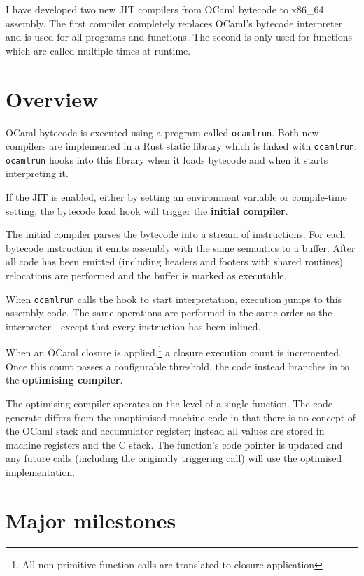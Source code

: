 I have developed two new JIT compilers from OCaml bytecode to x86\_64 assembly. The first compiler
completely replaces OCaml's bytecode interpreter and
is used for all programs and functions. The second is only used for functions which are called
multiple times at runtime.

\section{Overview}

OCaml bytecode is executed using a program called \texttt{ocamlrun}. Both new compilers are
implemented in a Rust static library which is linked with \texttt{ocamlrun}. \texttt{ocamlrun}
hooks into
this library when it loads bytecode and when it starts interpreting it.

If the JIT is enabled, either by setting an environment variable or compile-time setting, the
bytecode load hook will trigger the \textbf{initial compiler}.

The initial compiler parses the bytecode into a stream of instructions. For each bytecode
instruction it emits assembly with the same semantics to a buffer. After all code has been emitted
(including headers and footers with shared routines) relocations are performed and the buffer is
marked as executable.

When \texttt{ocamlrun} calls the hook to start interpretation, execution jumps to
this assembly code. The same operations are performed in the same order as the interpreter - except
that every
instruction has been inlined.

When an OCaml closure is applied,\footnote{All non-primitive function calls are translated to
      closure application} a closure execution count is incremented. Once this count passes a
configurable
threshold, the code instead branches in to the \textbf{optimising compiler}.

The optimising compiler operates on the level of a single function. The code generate differs from
the unoptimised machine code in that there is no concept of the OCaml stack and accumulator
register; instead all values are stored in machine registers and the C stack. The function's code
pointer is updated and any
future calls (including the originally triggering call) will use the optimised implementation.

\section{Major milestones}

